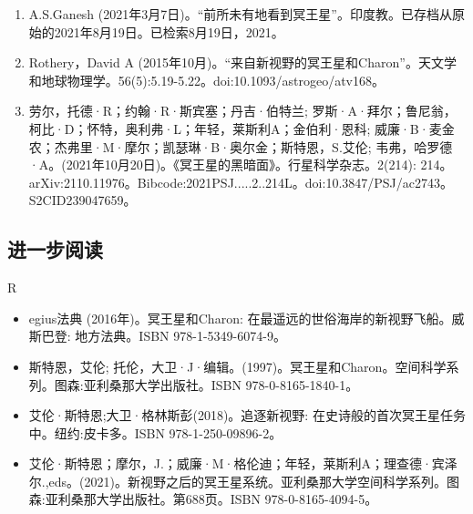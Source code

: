 \begin{enumerate}
\item A.S.Ganesh (2021年3月7日)。“前所未有地看到冥王星”。印度教。已存档从原始的2021年8月19日。已检索8月19日，2021。
\item Rothery，David A (2015年10月)。“来自新视野的冥王星和Charon”。天文学和地球物理学。56(5):5.19-5.22。doi:10.1093/astrogeo/atv168。
\item 劳尔，托德·R；约翰·R·斯宾塞；丹吉·伯特兰; 罗斯·A·拜尔；鲁尼翁，柯比·D；怀特，奥利弗·L；年轻，莱斯利A；金伯利·恩科; 威廉·B·麦金农；杰弗里·M·摩尔；凯瑟琳·B·奥尔金；斯特恩，S.艾伦; 韦弗，哈罗德·A。(2021年10月20日)。《冥王星的黑暗面》。行星科学杂志。2(214): 214。arXiv:2110.11976。Bibcode:2021PSJ.....2..214L。doi:10.3847/PSJ/ac2743。S2CID239047659。 
\end{enumerate}
\subsection{进一步阅读}
R\begin{itemize}
\item egius法典 (2016年)。冥王星和Charon: 在最遥远的世俗海岸的新视野飞船。威斯巴登: 地方法典。ISBN 978-1-5349-6074-9。
\item 斯特恩，艾伦; 托伦，大卫·J·编辑。(1997)。冥王星和Charon。空间科学系列。图森:亚利桑那大学出版社。ISBN 978-0-8165-1840-1。
\item 艾伦·斯特恩;大卫·格林斯彭(2018)。追逐新视野: 在史诗般的首次冥王星任务中。纽约:皮卡多。ISBN 978-1-250-09896-2。
\item 艾伦·斯特恩；摩尔，J.；威廉·M·格伦迪；年轻，莱斯利A；理查德·宾泽尔.,eds。(2021)。新视野之后的冥王星系统。亚利桑那大学空间科学系列。图森:亚利桑那大学出版社。第688页。ISBN 978-0-8165-4094-5。
\end{itemize}
